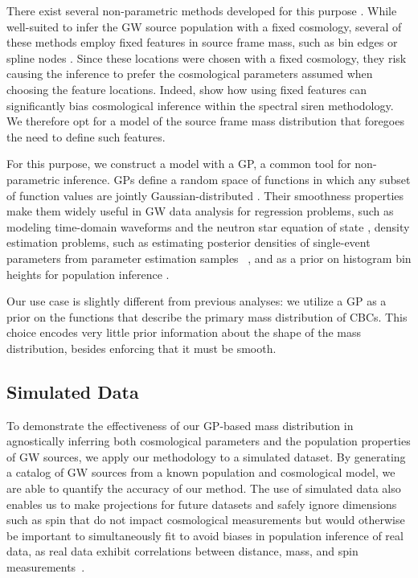 \documentclass[preprint2,linenumbers]{aastex631}
\begin{document}
There exist several non-parametric methods developed for this purpose \citep{tiwari_vamana_2021,edelman_aint_2022,sadiq_flexible_2022,rinaldi_hdpgmm_2022,edelman_cover_2023,mandel_extracting_2019,ray_non-parametric_2023,callister_parameter-free_2023}.
While well-suited to infer the \ac{GW} source population with a fixed cosmology, several of these methods employ fixed features in source frame mass, such as bin edges \citep{mandel_extracting_2019,ray_non-parametric_2023} or spline nodes \citep{edelman_aint_2022}.
Since these locations were chosen with a fixed cosmology, they risk causing the inference to prefer the cosmological parameters assumed when choosing the feature locations. 
Indeed, \citet{mastrogiovanni_importance_2021} show how using fixed features can significantly bias cosmological inference within the spectral siren methodology.
We therefore opt for a model of the source frame mass distribution that foregoes the need to define such features.

For this purpose, we construct a model with a \acf{GP}, a common tool for non-parametric inference. 
\Acp{GP} define a random space of functions in which any subset of function values are jointly Gaussian-distributed \citep{rasmussen_gaussian_2006}.
Their smoothness properties make them widely useful in \ac{GW} data analysis for regression problems, such as modeling time-domain waveforms \citep{doctor_statistical_2017, huerta_eccentric_2018} and the neutron star equation of state \citep{landry_nonparametric_2019}, density estimation problems, such as estimating posterior densities of single-event parameters from parameter estimation samples ~\citep{demilio_density_2021}, and as a prior on histogram bin heights for population inference \citep{mandel_model-independent_2017, li_flexible_2021, ray_non-parametric_2023}.

Our use case is slightly different from previous analyses:
we utilize a \ac{GP} as a prior on the functions that describe the primary mass distribution of \acp{CBC}.
This choice encodes very little prior information about the shape of the mass distribution, besides enforcing that it must be smooth.

\subsection{Simulated Data}
\label{sec:data generation}
To demonstrate the effectiveness of our \ac{GP}-based mass distribution in agnostically inferring both cosmological parameters and the population properties of \ac{GW} sources, we apply our methodology to a simulated dataset.
By generating a catalog of \ac{GW} sources from a known population and cosmological model, we are able to quantify the accuracy of our method.
The use of simulated data also enables us to make projections for future datasets and safely ignore dimensions such as spin that do not impact cosmological measurements but would otherwise be important to simultaneously fit to avoid biases in population inference of real data, as real data exhibit correlations between distance, mass, and spin measurements~\citep{biscoveanu_sources_2021}.
\end{document}
